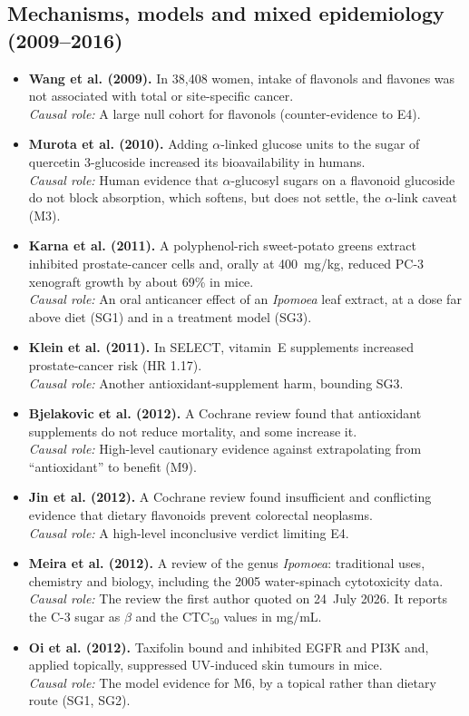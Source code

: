 \documentclass[11pt,a4paper]{article}
\newenvironment{litlist}{\begin{itemize}[leftmargin=2.6em,labelwidth=2.2em,labelsep=0.4em,align=left,itemsep=5pt,topsep=4pt]}{\end{itemize}}
\newcommand{\litentry}[4]{\item[\cite{#1}] \textbf{\color{navy}#2.} #3\\[1pt]
  {\color{teal}\textit{Causal role:}} #4}
\begin{document}
\subsection{Mechanisms, models and mixed epidemiology (2009--2016)}
\begin{litlist}
\litentry{wang2009}{Wang et al. (2009)}{In 38{,}408 women, intake of flavonols and flavones was not associated with total or site-specific cancer.}{A large null cohort for flavonols (counter-evidence to E4).}

\litentry{murota2010}{Murota et al. (2010)}{Adding $\alpha$-linked glucose units to the sugar of quercetin 3-glucoside increased its bioavailability in humans.}{Human evidence that $\alpha$-glucosyl sugars on a flavonoid glucoside do not block absorption, which softens, but does not settle, the $\alpha$-link caveat (M3).}

\litentry{karna2011}{Karna et al. (2011)}{A polyphenol-rich sweet-potato greens extract inhibited prostate-cancer cells and, orally at 400~mg/kg, reduced PC-3 xenograft growth by about 69\% in mice.}{An oral anticancer effect of an \emph{Ipomoea} leaf extract, at a dose far above diet (SG1) and in a treatment model (SG3).}

\litentry{klein2011}{Klein et al. (2011)}{In SELECT, vitamin~E supplements increased prostate-cancer risk (HR 1.17).}{Another antioxidant-supplement harm, bounding SG3.}

\litentry{bjelakovic2012}{Bjelakovic et al. (2012)}{A Cochrane review found that antioxidant supplements do not reduce mortality, and some increase it.}{High-level cautionary evidence against extrapolating from ``antioxidant'' to benefit (M9).}

\litentry{jin2012}{Jin et al. (2012)}{A Cochrane review found insufficient and conflicting evidence that dietary flavonoids prevent colorectal neoplasms.}{A high-level inconclusive verdict limiting E4.}

\litentry{meira2012}{Meira et al. (2012)}{A review of the genus \emph{Ipomoea}: traditional uses, chemistry and biology, including the 2005 water-spinach cytotoxicity data.}{The review the first author quoted on 24~July 2026. It reports the C-3 sugar as $\beta$ and the CTC$_{50}$ values in mg/mL.}

\litentry{oi2012}{Oi et al. (2012)}{Taxifolin bound and inhibited EGFR and PI3K and, applied topically, suppressed UV-induced skin tumours in mice.}{The model evidence for M6, by a topical rather than dietary route (SG1, SG2).}


\end{litlist}
\end{document}
